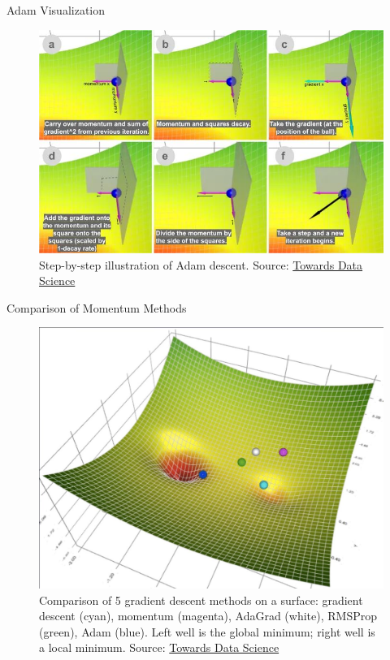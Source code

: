 \documentclass[serif, aspectratio=169]{beamer}
\begin{document}
\begin{frame}{Adam Visualization}
\begin{figure}
    \centering
    \includegraphics[width=0.65\linewidth]{pic/adam_towardsdatascience.jpg}
    \caption{\footnotesize Step-by-step illustration of Adam descent. Source: \href{https://towardsdatascience.com/a-visual-explanation-of-gradient-descent-methods-momentum-adagrad-rmsprop-adam-f898b102325c}{Towards Data Science}}
\end{figure}

\end{frame}

\begin{frame}{Comparison of Momentum Methods}
    \centering
    \begin{figure}
        \centering
        \includegraphics[width=0.5\linewidth]{pic/comparison.jpg}
        \caption{\footnotesize Comparison of 5 gradient descent methods on a surface: gradient descent (cyan), momentum (magenta), AdaGrad (white), RMSProp (green), Adam (blue). Left well is the global minimum; right well is a local minimum. Source: \href{https://towardsdatascience.com/a-visual-explanation-of-gradient-descent-methods-momentum-adagrad-rmsprop-adam-f898b102325c}{Towards Data Science}}
    \end{figure}
\end{frame}
\end{document}

